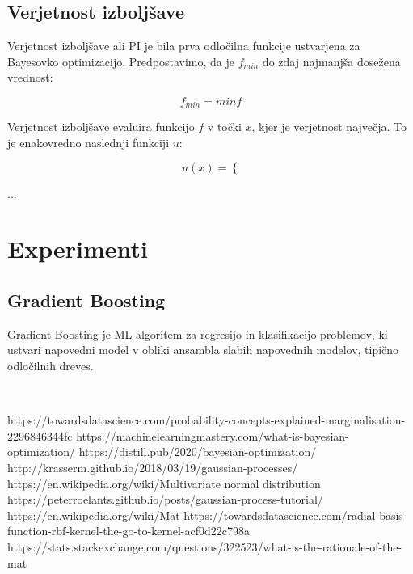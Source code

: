 \documentclass[a4paper, 12pt]{book}
\begin{document}
\section{Verjetnost izboljšave}

Verjetnost izboljšave ali PI je bila prva odločilna funkcije ustvarjena za Bayesovko optimizacijo. 
Predpostavimo, da je $f_{min}$ do zdaj najmanjša dosežena vrednost:

\begin{equation}
	f_{min} = min f
\end{equation}

Verjetnost izboljšave evaluira funkcijo $f$ v točki $x$, kjer je verjetnost največja. To je enakovredno naslednji funkciji $u$:

\begin{equation}
	u(x) = \left\{ \right.
\end{equation}

...

\chapter{Experimenti}

\section{Gradient Boosting}

Gradient Boosting je ML algoritem za regresijo in klasifikacijo problemov, ki ustvari napovedni model v obliki ansambla slabih napovednih modelov, tipično odločilnih dreves.


\newpage %
\ \\
\clearpage
{}

https://towardsdatascience.com/probability-concepts-explained-marginalisation-2296846344fc
https://machinelearningmastery.com/what-is-bayesian-optimization/
https://distill.pub/2020/bayesian-optimization/
http://krasserm.github.io/2018/03/19/gaussian-processes/
https://en.wikipedia.org/wiki/Multivariate normal distribution
https://peterroelants.github.io/posts/gaussian-process-tutorial/
https://en.wikipedia.org/wiki/Mat%
https://towardsdatascience.com/radial-basis-function-rbf-kernel-the-go-to-kernel-acf0d22c798a
https://stats.stackexchange.com/questions/322523/what-is-the-rationale-of-the-mat%
\end{document}
